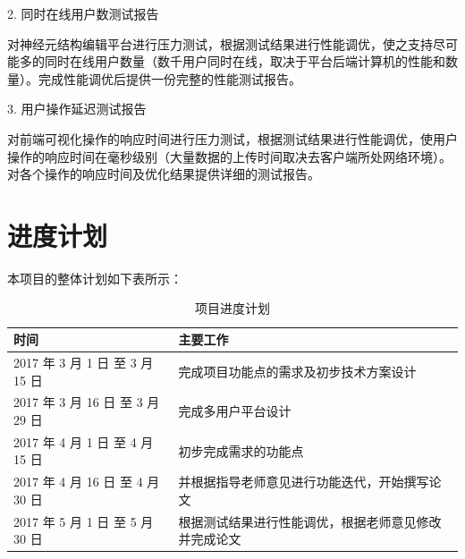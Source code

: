 2. 同时在线用户数测试报告

对神经元结构编辑平台进行压力测试，根据测试结果进行性能调优，使之支持尽可能多的同时在线用户数量（数千用户同时在线，取决于平台后端计算机的性能和数量）。完成性能调优后提供一份完整的性能测试报告。

3. 用户操作延迟测试报告

对前端可视化操作的响应时间进行压力测试，根据测试结果进行性能调优，使用户操作的响应时间在毫秒级别（大量数据的上传时间取决去客户端所处网络环境）。对各个操作的响应时间及优化结果提供详细的测试报告。


\section{进度计划}

本项目的整体计划如下表所示：

\begin{table}[!htbp]
\centering
\begin{tabular}{|l|l|}
\hline
时间 & 主要工作 \\ \hline
2017 年 3 月 1 日 至 3 月 15 日& 完成项目功能点的需求及初步技术方案设计 \\ \hline
2017 年 3 月 16 日 至 3 月 29 日& 完成多用户平台设计 \\ \hline
2017 年 4 月 1 日 至 4 月 15 日& 初步完成需求的功能点 \\ \hline
2017 年 4 月 16 日 至 4 月 30 日& 并根据指导老师意见进行功能迭代，开始撰写论文 \\ \hline
2017 年 5 月 1 日 至 5 月 30 日& 根据测试结果进行性能调优，根据老师意见修改并完成论文 \\ \hline

\end{tabular}
\caption{项目进度计划}
\label{table:schedule}
\end{table}


{
\renewcommand{\chapter}[2]{\section*{#2}\addcontentsline{toc}{section}{#2}}

}

